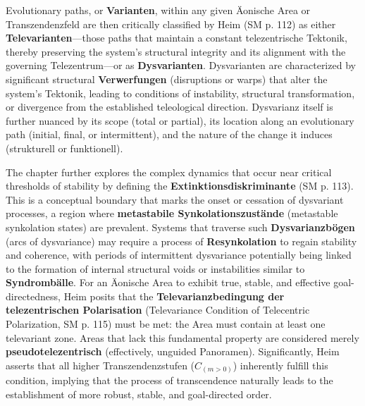 \documentclass[12pt]{article}
\begin{document}
Evolutionary paths, or \textbf{Varianten}, within any given Äonische Area or Transzendenzfeld are then critically classified by Heim (SM p. 112) as either \textbf{Televarianten}—those paths that maintain a constant telezentrische Tektonik, thereby preserving the system's structural integrity and its alignment with the governing Telezentrum—or as \textbf{Dysvarianten}. Dysvarianten are characterized by significant structural \textbf{Verwerfungen} (disruptions or warps) that alter the system's Tektonik, leading to conditions of instability, structural transformation, or divergence from the established teleological direction. Dysvarianz itself is further nuanced by its scope (total or partial), its location along an evolutionary path (initial, final, or intermittent), and the nature of the change it induces (strukturell or funktionell).

The chapter further explores the complex dynamics that occur near critical thresholds of stability by defining the \textbf{Extinktionsdiskriminante} (SM p. 113). This is a conceptual boundary that marks the onset or cessation of dysvariant processes, a region where \textbf{metastabile Synkolationszustände} (metastable synkolation states) are prevalent. Systems that traverse such \textbf{Dysvarianzbögen} (arcs of dysvariance) may require a process of \textbf{Resynkolation} to regain stability and coherence, with periods of intermittent dysvariance potentially being linked to the formation of internal structural voids or instabilities similar to \textbf{Syndrombälle}. For an Äonische Area to exhibit true, stable, and effective goal-directedness, Heim posits that the \textbf{Televarianzbedingung der telezentrischen Polarisation} (Televariance Condition of Telecentric Polarization, SM p. 115) must be met: the Area must contain at least one televariant zone. Areas that lack this fundamental property are considered merely \textbf{pseudotelezentrisch} (effectively, unguided Panoramen). Significantly, Heim asserts that all higher Transzendenzstufen (\( C_{(m>0)} \)) inherently fulfill this condition, implying that the process of transcendence naturally leads to the establishment of more robust, stable, and goal-directed order.
\end{document}
